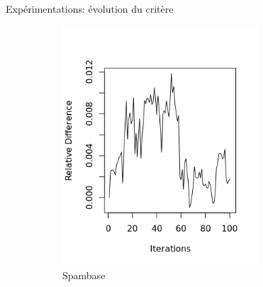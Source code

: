 \documentclass[hyperref={pdfpagelabels=false}]{beamer}
\begin{document}
    \begin{frame}{Expérimentations: évolution du critère}
        \begin{figure}[!h]
            \centering
            \caption{Différences relatives du critère collaboratif avec et sans 
                optimisation des $\beta$ tout au long du processus 
                d'apprentissage.
            }
            \begin{subfigure}[b]{0.32\textwidth}
                \centering
                \includegraphics[width=0.8\textwidth]{spambase_RD3.png}
                \caption{Spambase}
            \end{subfigure}
            \begin{subfigure}[b]{0.32\textwidth}
                \centering

\end{subfigure}
\end{figure}
\end{frame}
\end{document}
